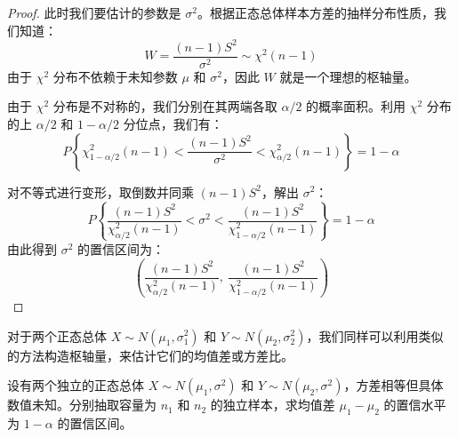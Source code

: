 \documentclass[lang=cn,11pt]{elegantbook}
\begin{document}
\begin{proof}
此时我们要估计的参数是 $\sigma^2$。根据正态总体样本方差的抽样分布性质，我们知道：
\begin{equation*}
W=\frac{(n-1)S^2}{\sigma^2} \sim \chi^2(n-1)
\end{equation*}
由于 $\chi^2$ 分布不依赖于未知参数 $\mu$ 和 $\sigma^2$，因此 $W$ 就是一个理想的枢轴量。

由于 $\chi^2$ 分布是不对称的，我们分别在其两端各取 $\alpha/2$ 的概率面积。利用 $\chi^2$ 分布的上 $\alpha/2$ 和 $1-\alpha/2$ 分位点，我们有：
\begin{equation*}
P\left\{\chi^2_{1-\alpha/2}(n-1) < \frac{(n-1)S^2}{\sigma^2} < \chi^2_{\alpha/2}(n-1)\right\}=1-\alpha
\end{equation*}

对不等式进行变形，取倒数并同乘 $(n-1)S^2$，解出 $\sigma^2$：
\begin{equation*}
P\left\{\frac{(n-1)S^2}{\chi^2_{\alpha/2}(n-1)} < \sigma^2 < \frac{(n-1)S^2}{\chi^2_{1-\alpha/2}(n-1)}\right\}=1-\alpha
\end{equation*}
由此得到 $\sigma^2$ 的置信区间为：
\begin{equation*}
\left(\frac{(n-1)S^2}{\chi^2_{\alpha/2}(n-1)},\ \frac{(n-1)S^2}{\chi^2_{1-\alpha/2}(n-1)}\right)
\end{equation*}
\end{proof}

对于两个正态总体 $X \sim N(\mu_1, \sigma_1^2)$ 和 $Y \sim N(\mu_2, \sigma_2^2)$，我们同样可以利用类似的方法构造枢轴量，来估计它们的均值差或方差比。

\begin{exercise} \label{ex:ci_diff_mu_unknown_var}
设有两个独立的正态总体 $X \sim N(\mu_1, \sigma^2)$ 和 $Y \sim N(\mu_2, \sigma^2)$，方差相等但具体数值未知。分别抽取容量为 $n_1$ 和 $n_2$ 的独立样本，求均值差 $\mu_1-\mu_2$ 的置信水平为 $1-\alpha$ 的置信区间。
\end{exercise}
\end{document}
